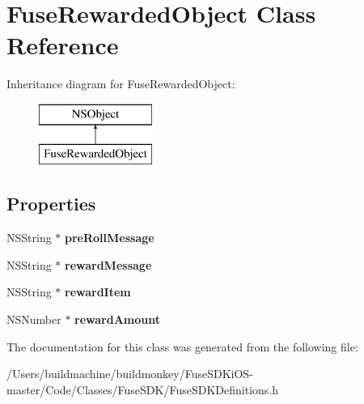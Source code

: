 \hypertarget{interface_fuse_rewarded_object}{}\section{Fuse\+Rewarded\+Object Class Reference}
\label{interface_fuse_rewarded_object}
Inheritance diagram for Fuse\+Rewarded\+Object\+:\begin{figure}[H]
\begin{center}
\leavevmode
\includegraphics[height=2.000000cm]{interface_fuse_rewarded_object}
\end{center}
\end{figure}
\subsection*{Properties}
\begin{DoxyCompactItemize}
\item 
\hypertarget{interface_fuse_rewarded_object_ae1d1c7f4c017e468a6b3c1de53e5baf7}{}N\+S\+String $\ast$ {\bfseries pre\+Roll\+Message}\label{interface_fuse_rewarded_object_ae1d1c7f4c017e468a6b3c1de53e5baf7}

\item 
\hypertarget{interface_fuse_rewarded_object_acd69c101bf237f44d69b5cc310616767}{}N\+S\+String $\ast$ {\bfseries reward\+Message}\label{interface_fuse_rewarded_object_acd69c101bf237f44d69b5cc310616767}

\item 
\hypertarget{interface_fuse_rewarded_object_ac61bc6108654e4d118a6f97b79221111}{}N\+S\+String $\ast$ {\bfseries reward\+Item}\label{interface_fuse_rewarded_object_ac61bc6108654e4d118a6f97b79221111}

\item 
\hypertarget{interface_fuse_rewarded_object_a2db1b3a56b00af0fc99861443d591913}{}N\+S\+Number $\ast$ {\bfseries reward\+Amount}\label{interface_fuse_rewarded_object_a2db1b3a56b00af0fc99861443d591913}

\end{DoxyCompactItemize}


The documentation for this class was generated from the following file\+:\begin{DoxyCompactItemize}
\item 
/\+Users/buildmachine/buildmonkey/\+Fuse\+S\+D\+Ki\+O\+S-\/master/\+Code/\+Classes/\+Fuse\+S\+D\+K/Fuse\+S\+D\+K\+Definitions.\+h\end{DoxyCompactItemize}
